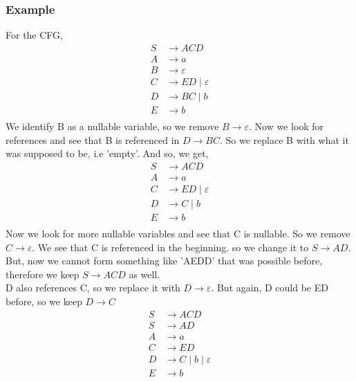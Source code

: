 \documentclass{article}
\begin{document}
    \subsubsection*{Example}
    For the CFG,
    \begin{equation}
        \begin{split}
            S&\to ACD\\
            A&\to a\\
            B&\to \varepsilon\\
            C&\to ED\;|\;\varepsilon\\
            D&\to BC\;|\;b\\
            E&\to b\\
        \end{split}
    \end{equation}
    We identify B as a nullable variable, so we remove $B\to\varepsilon$.
    Now we look for references and see that B is referenced in $D\to BC$. So we replace B with what it was supposed to be, i.e 'empty'. And so, we get,
    \begin{equation}
        \begin{split}
            S&\to ACD\\
            A&\to a\\
            C&\to ED\;|\;\varepsilon\\
            D&\to C\;|\;b\\
            E&\to b\\
        \end{split}
    \end{equation} 
    Now we look for more nullable variables and see that C is nullable. So we remove $C\to\varepsilon$. 
    We see that C is referenced in the beginning. so we change it to $S\to AD$. But, now we cannot form something like 'AEDD' that was possible before, therefore we keep $S\to ACD$ as well.\\
    D also references C, so we replace it with $D\to\varepsilon$. But again, D could be ED before, so we keep $D\to C$
    \begin{equation}
        \begin{split}
            S&\to ACD\\
            S&\to AD\\
            A&\to a\\
            C&\to ED\\
            D&\to C\;|\;b\;|\;\varepsilon\\
            E&\to b\\
        \end{split}
    \end{equation}
\end{document}

